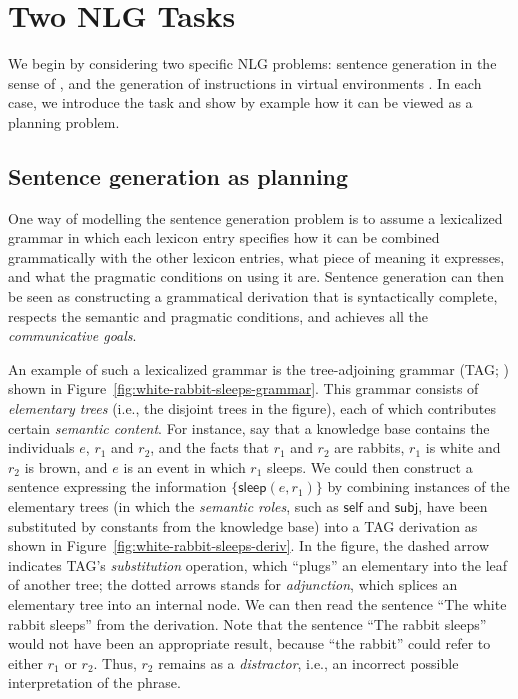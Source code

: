 \section{Two NLG Tasks}
\label{sec:domains}

We begin by considering two specific NLG problems: sentence generation in the
sense of \citet{KolSto07}, and the generation of instructions in virtual
environments \citep{ByrKolStrCasDalMooObe09}. In each case, we introduce the
task and show by example how it can be viewed as a planning problem.


\subsection{Sentence generation as planning}
\label{sec:domain-crisp}

One way of modelling the sentence generation problem is to assume a
lexicalized grammar in which each lexicon entry specifies how it can
be combined grammatically with the other lexicon entries, what piece
of meaning it expresses, and what the pragmatic conditions on using it
are. Sentence generation can then be seen as constructing a
grammatical derivation that is syntactically complete, respects the
semantic and pragmatic conditions, and achieves all the
\emph{communicative goals}.

An example of such a lexicalized grammar is the tree-adjoining grammar
(TAG; \citealt{joshi;etal1997}) shown in
Figure~\ref{fig:white-rabbit-sleeps-grammar}. This grammar consists of
\emph{elementary trees} (i.e., the disjoint trees in the figure), each of
which contributes certain \emph{semantic content}. For instance, say that a
knowledge base contains the individuals $e$, $r_1$ and $r_2$, and the facts
that $r_1$ and $r_2$ are rabbits, $r_1$ is white and $r_2$ is brown, and
$e$ is an event in which $r_1$ sleeps. We could then construct a sentence
expressing the information $\{\mathsf{sleep}(e,r_1)\}$ by combining
instances of the elementary trees (in which the \emph{semantic roles}, such
as $\mathsf{self}$ and $\mathsf{subj}$, have been substituted by constants
from the knowledge base) into a TAG derivation as shown in
Figure~\ref{fig:white-rabbit-sleeps-deriv}. In the figure, the dashed arrow
indicates TAG's \emph{substitution} operation, which ``plugs'' an
elementary into the leaf of another tree; the dotted arrows stands for
\emph{adjunction}, which splices an elementary tree into an internal node.
We can then read the sentence ``The white rabbit sleeps'' from the
derivation. Note that the sentence ``The rabbit sleeps'' would not have
been an appropriate result, because ``the rabbit'' could refer to either
$r_1$ or $r_2$. Thus, $r_2$ remains as a \emph{distractor}, i.e., an
incorrect possible interpretation of the phrase.

